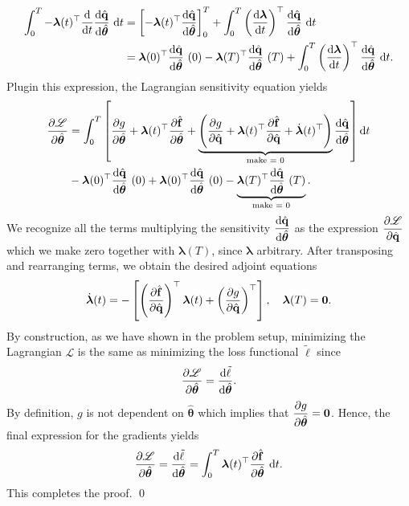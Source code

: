 \begin{align*}
    \int_0^T -\bm{\lambda}(t)^{\top}\dv{t}\dv{\hat{\mathbf{q}}}{\hat{\bm{\theta}}}~\dd t &= \left[ -\bm{\lambda}(t)^{\top}\dv{\hat{\mathbf{q}}}{\hat{\bm{\theta}}}\right]_0^T + \int_0^T \left( \dv{\bm{\lambda}}{t}\right)^{\top}\dv{\hat{\mathbf{q}}}{\hat{\bm{\theta}}}~\dd t\\
    &= \bm{\lambda}(0)^{\top}\dv{\hat{\mathbf{q}}}{\hat{\bm{\theta}}}~(0) - \bm{\lambda}(T)^{\top}\dv{\hat{\mathbf{q}}}{\hat{\bm{\theta}}}~(T) + \int_0^T \left( \dv{\bm{\lambda}}{t}\right)^{\top}\dv{\hat{\mathbf{q}}}{\hat{\bm{\theta}}}~\dd t.
\end{align*}
Plugin this expression, the Lagrangian sensitivity equation  yields\\
\begin{align*}
   \pdv{\mathscr{L}}{\hat{\bm{\theta}}} &= \int_0^T\left[ \pdv{g}{\hat{\bm{\theta}}} + \bm{\lambda}(t)^{\top} \pdv{\hat{\mathbf{f}}}{\hat{\bm{\theta}}} + \underbrace{\left( \pdv{g}{\hat{\mathbf{q}}} + \bm{\lambda}(t)^{\top}\pdv{\hat{\mathbf{f}}}{\hat{\mathbf{q}}}+ \dot{\bm{\lambda}}(t)^{\top}\right)}_{\text{make = 0}} \dv{\hat{\mathbf{q}}}{\hat{\bm{\theta}}} \right]\dd t \\
   & - \bm{\lambda}(0)^{\top}\dv{\hat{\mathbf{q}}}{\hat{\bm{\theta}}}~(0)+\bm{\lambda}(0)^{\top}\dv{\hat{\mathbf{q}}}{\hat{\bm{\theta}}}~(0) - \underbrace{\bm{\lambda}(T)^{\top}\dv{\hat{\mathbf{q}}}{\hat{\bm{\theta}}}~(T)}_{\text{make = 0}}.
\end{align*}
We recognize all the terms multiplying the sensitivity $\displaystyle\dv{\hat{\mathbf{q}}}{\hat{\bm{\theta}}}$ as the expression $\displaystyle\pdv{\mathscr{L}}{\hat{\mathbf{q}}}$ which we make zero together with $\bm{\lambda}(T)$, since $\bm{\lambda}$ arbitrary.
 After transposing and rearranging terms, we obtain the desired adjoint equations\\
\begin{equation*}
    \dot{\bm{\lambda}}(t) = -\left[ \left(\pdv{\hat{\mathbf{f}}}{\hat{\mathbf{q}}}\right)^{\top} \bm{\lambda}(t)  + \left(\pdv{g}{\hat{\mathbf{q}}}\right)^{\top}\right], \quad\bm{\lambda}(T) = \bm{0}.
\end{equation*}
By construction, as we have shown in the problem setup,  minimizing the Lagrangian $\mathscr{L}$ is the same as minimizing the loss functional $\tilde\ell$ since\\
$$\pdv{\mathscr{L}}{\hat{\bm{\theta}}} = \dv{\tilde\ell}{\hat{\bm{\theta}}}.$$
By definition, $g$ is not dependent on $\hat{\bm{\theta}}$ which implies that $\displaystyle\pdv{g}{\hat{\bm{\theta}}}=\bm{0}$. Hence, the final expression for the gradients yields\\
\begin{equation*}
    \pdv{\mathscr{L}}{\hat{\bm{\theta}}} =\dv{\tilde\ell}{\hat{\bm{\theta}}} = \int_0^T \bm{\lambda}(t)^{\top} \pdv{\hat{\mathbf{f}}}{\hat{\bm{\theta}}}~\dd t.
\end{equation*}
This completes the proof.
\qed

